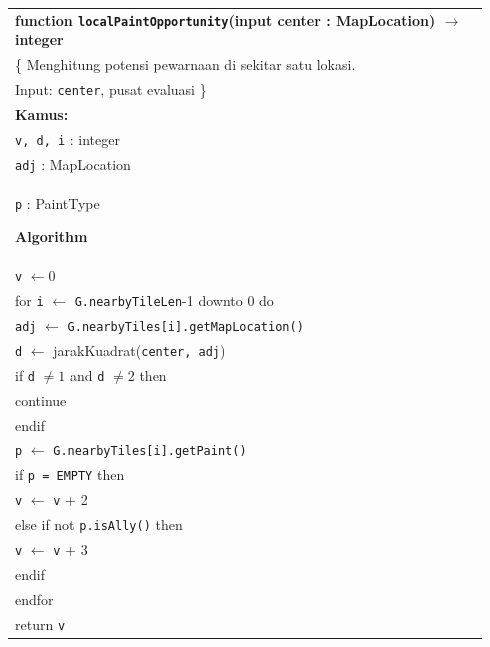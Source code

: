 \documentclass{article}
\newenvironment{pseudobox}
{
\centering
\begin{longtable}{|p{0.94\linewidth}|}
\hline
}
{
\\ \hline
\end{longtable}
\vspace{0.05cm}
}
\begin{document}
\begin{enumerate}[label=\alph*.]
\begin{enumerate}[label=\alph*.]
\begin{pseudobox}
\textbf{function \texttt{localPaintOpportunity}(input center : MapLocation) $\rightarrow$ integer} \\
\{ Menghitung potensi pewarnaan di sekitar satu lokasi. \\
Input: \texttt{center}, pusat evaluasi
\}\\

\textbf{Kamus:} \\
\hspace*{1.5em}\texttt{v, d, i} : integer \\
\hspace*{1.5em}\texttt{adj} : MapLocation \\
\hspace*{1.5em}\texttt{p} : PaintType

\textbf{Algorithm} \\
\hspace*{1.5em}\texttt{v} $\leftarrow 0$ \\
\hspace*{1.5em}for \texttt{i} $\leftarrow$ \texttt{G.nearbyTileLen}-1 downto 0 do \\
\hspace*{3em}\texttt{adj} $\leftarrow$ \texttt{G.nearbyTiles[i].getMapLocation()} \\
\hspace*{3em}\texttt{d} $\leftarrow$ jarakKuadrat(\texttt{center, adj}) \\
\hspace*{3em}if \texttt{d} $\neq 1$ and \texttt{d} $\neq 2$ then \\
\hspace*{4.5em}continue \\
\hspace*{3em}endif \\

\hspace*{3em}\texttt{p} $\leftarrow$ \texttt{G.nearbyTiles[i].getPaint()} \\
\hspace*{3em}if \texttt{p = EMPTY} then \\
\hspace*{4.5em}\texttt{v} $\leftarrow$ \texttt{v} + 2 \\
\hspace*{3em}else if not \texttt{p.isAlly()} then \\
\hspace*{4.5em}\texttt{v} $\leftarrow$ \texttt{v} + 3 \\
\hspace*{3em}endif \\
\hspace*{1.5em}endfor \\
\hspace*{1.5em}return \texttt{v}
\end{pseudobox}


\end{enumerate}
\end{enumerate}
\end{document}
